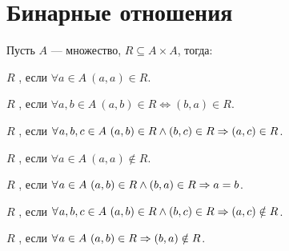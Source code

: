 \section{Бинарные отношения}\label{sec:ch-2-sec-2}

\begin{definition}
    Пусть $A$ --- множество, $R \subseteq A \times A$, тогда:

    \begin{compactitem}
        \item $R$ , если $\forall a \in A\ (a, a) \in R$.
        \item $R$ , если $\forall a, b \in A\ (a, b) \in R \iff (b, a) \in R$.
        \item $R$ , если $\forall a, b, c \in A\ (a, b) \in R \land (b, c) \in R \imp (a, c) \in R$.
        \item $R$ , если $\forall a \in A\ (a, a) \notin R$.
        \item $R$ , если $\forall a \in A\ (a, b) \in R \land (b, a) \in R \imp a = b$.
        \item $R$ , если $\forall a, b, c \in A\ (a, b) \in R \land (b, c) \in R \imp (a, c) \notin R$.
        \item $R$ , если $\forall a \in A\ (a, b) \in R \imp (b, a) \notin R$.
    \end{compactitem}
\end{definition}